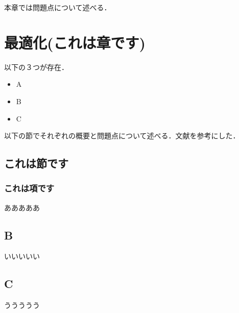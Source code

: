 本章では問題点について述べる．

\section{最適化(これは章です)} %
以下の３つが存在．
\begin{itemize} %
    \item A
    \item B
    \item C
\end{itemize}
    
以下の節でそれぞれの概要と問題点について述べる．文献\cite{hmdf}を参考にした．%
\subsection{これは節です} %
\subsubsection{これは項です} %
あああああ
\subsection{B}
いいいいい
\subsection{C}
ううううう




